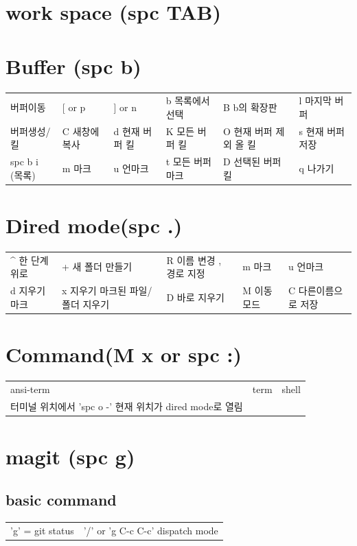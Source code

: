 \documentclass[11pt]{article}
\begin{document}
\section{work space (spc TAB)}
\label{sec:org070d5db}
\section{Buffer (spc b)}
\label{sec:orgb19eaa9}
\begin{center}
\begin{tabular}{llllll}
버퍼이동 & [ or p & ] or n & b 목록에서 선택 & B b의 확장판 & l 마지막 버퍼\\
버퍼생성/킬 & C 새창에 복사 & d 현재 버퍼 킬 & K 모든 버퍼 킬 & O 현재 버퍼 제외 올 킬 & s 현재 버퍼 저장\\
spc b i (목록) & m 마크 & u 언마크 & t 모든 버퍼 마크 & D  선택된 버퍼 킬 & q 나가기\\
\end{tabular}
\end{center}
\section{Dired mode(spc .)}
\label{sec:org9183da4}
\begin{center}
\begin{tabular}{lllll}
\^{} 한 단계 위로 & + 새 폴더 만들기 & R 이름 변경 , 경로 지정 & m 마크 & u 언마크\\
d 지우기 마크 & x 지우기 마크된 파일/폴더 지우기 & D 바로 지우기 & M 이동 모드 & C 다른이름으로 저장\\
\end{tabular}
\end{center}
\section{Command(M x or spc :)}
\label{sec:orgc3d3212}
\begin{center}
\begin{tabular}{lll}
ansi-term & term & shell\\
터미널 위치에서 'spc o -' 현재 위치가 dired mode로 열림 &  & \\
\end{tabular}
\end{center}
\section{magit (spc g)}
\label{sec:orgeadc8c5}
\subsection{basic command}
\label{sec:org9144772}
\begin{center}
\begin{tabular}{ll}
'g' = git status & '/' or 'g C-c C-c'  dispatch mode\\
\end{tabular}
\end{center}
\end{document}
